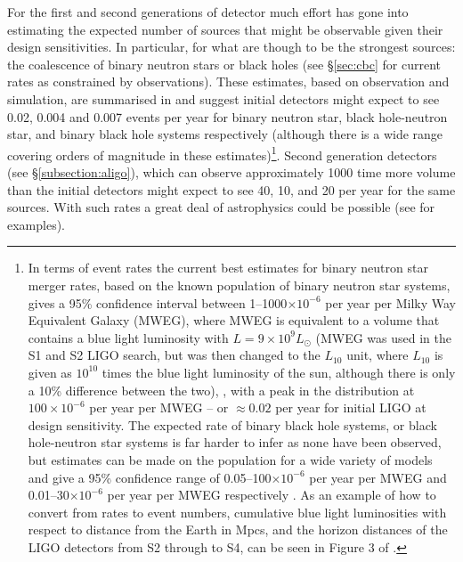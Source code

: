 \documentclass{article}
\begin{document}
For the first and second generations of detector much effort has gone into estimating
the expected number of sources that might be observable given their design
sensitivities. In particular, for what are
though to be the strongest sources: the coalescence of binary neutron stars or black 
holes (see \S\ref{sec:cbc} for current rates as constrained by observations). These 
estimates, based on observation and simulation, are summarised in \cite{Abadie:2010e}
and suggest initial detectors might expect to see 0.02, 0.004 and 0.007 events per 
year for binary neutron star, black hole-neutron star, and binary black hole systems
respectively (although there is a wide range covering orders of magnitude in these
estimates)\footnote{In terms of event rates the current best 
estimates for binary neutron
star merger rates, based on the known population of binary neutron star systems,
gives a 95\% confidence interval between 1--1000$\times10^{-6}$ per year per 
Milky Way Equivalent Galaxy (MWEG), where MWEG is equivalent to a volume that contains a blue
light luminosity with $L = 9\times10^9L_{\odot}$ (MWEG was used in
the S1 and S2 LIGO search, but was then changed to the $L_{10}$ unit, where $L_{10}$ is
given as $10^{10}$ times the blue light luminosity of the sun, although
there is only a 10\% difference between the two), \cite{Abadie:2010e, 
Kalogera:2004a, Kalogera:2004b}, with a peak in the distribution
at $100\times10^{-6}$ per year per MWEG -- or $\approx 0.02$ per year for initial 
LIGO at design sensitivity. The expected rate
of binary black hole systems, or black hole-neutron star systems is far harder
to infer as none have been observed, but estimates can be made on the population
for a wide variety of models and give a 95\% confidence range of
0.05--100$\times10^{-6}$ per year per MWEG and 0.01--30$\times10^{-6}$ per year per MWEG
respectively \cite{Abadie:2010e, OShaughnessy:2005, OShaughnessy:2008, Abbott:2008a}.
As an example of how to convert from rates to event numbers, cumulative blue light 
luminosities with respect to distance from the Earth in
Mpcs, and the horizon distances of the LIGO detectors from S2 through to S4,
can be seen in Figure 3 of \cite{Abbott:2008a}.}. Second generation detectors 
(see \S\ref{subsection:aligo}), which can observe approximately 
1000 time more volume than the initial detectors might expect to see 40, 10, and 20
per year for the same sources. With such rates a great deal of astrophysics could be
possible (see \cite{Sathyaprakash:2009} for examples).
\end{document}
